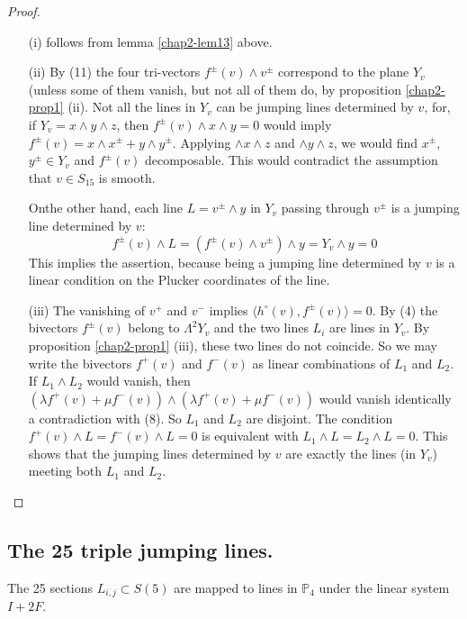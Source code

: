 \begin{proof}
\begin{itemize}
\item[(i)] follows from lemma \ref{chap2-lem13} above.

\item[(ii)] By (11) the four tri-vectors
$f^{\pm}(v)\wedge v^{\pm}$ correspond to the plane $Y_{v}$ (unless
some of them vanish, but not all of them do, by
proposition \ref{chap2-prop1} (ii). Not all the lines in $Y_{v}$ can
be jumping lines determined by $v$, for, if $Y_{v}=x\wedge y\wedge z$,
then $f^{\pm}(v)\wedge x\wedge y=0$ would imply $f^{\pm}(v)=x\wedge
x^{\pm}+y\wedge y^{\pm}$. Applying $\wedge x\wedge z$ and $\wedge
y\wedge z$, we would find $x^{\pm}$, $y^{\pm}\in Y_{v}$ and
$f^{\pm}(v)$ decomposable. This would contradict the assumption that
$v\in S_{15}$ is smooth.

On\pageoriginale the other hand, each line $L=v^{\pm}\wedge y$ in
$Y_{v}$ passing through $v^{\pm}$ is a jumping line determined by $v$:
$$
f^{\pm}(v)\wedge L=(f^{\pm}(v)\wedge v^{\pm})\wedge y=Y_{v}\wedge y=0
$$
This implies the assertion, because being a jumping line determined by
$v$ is a linear condition on the Plucker coordinates of the line.

\item[(iii)] The vanishing of $v^{+}$ and $v^{-}$ implies $\langle
h^{\circ}(v), f^{\pm}(v)\rangle=0$. By (4) the bivectors
$f^{\pm}(v)$ belong to $\Lambda^{2}Y_{v}$ and the two lines $L_{i}$
are lines in $Y_{v}$. By proposition \ref{chap2-prop1} (iii), these
two lines do not coincide. So we may write the bivectors $f^{+}(v)$
and $f^{-}(v)$ as linear combinations of $L_{1}$ and $L_{2}$. If
$L_{1}\wedge L_{2}$ would vanish, then $(\lambda f^{+}(v)+\mu
f^{-}(v))\wedge (\lambda f^{+}(v)+\mu f^{-}(v))$ would vanish
identically a contradiction with (8). So $L_{1}$ and
$L_{2}$ are disjoint. The condition $f^{+}(v)\wedge L=f^{-}(v)\wedge
L=0$ is equivalent with $L_{1}\wedge L=L_{2}\wedge L=0$. This shows
that the jumping lines determined by $v$ are exactly the lines (in
$Y_{v}$) meeting both $L_{1}$ and $L_{2}$.
\end{itemize}
\end{proof}

\subsection{The 25 triple jumping lines.}\label{chap2-sec5.2}

The 25 sections $L_{i,j}\subset S(5)$ are mapped to lines in
$\mathbb{P}_{4}$ under the linear system $I+2F$.

